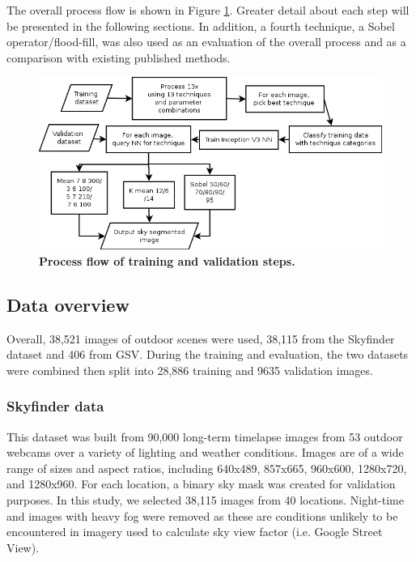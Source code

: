 \documentclass[final,3p,times,authoryear]{elsarticle}
\begin{document}
The overall process flow is shown in Figure \ref{fig:process}. Greater detail about each step will be presented in the following sections. In addition, a fourth technique, a Sobel operator/flood-fill, was also used as an evaluation of the overall process and as a comparison with existing published methods.

\begin{figure}
\centering    
\includegraphics[scale=0.60]{Images/TrainingProcessDiagram}
\caption{\bf Process flow of training and validation steps.}    
 \label{fig:process}  
\end{figure} 


\subsection{Data overview}\label{sec:data}
Overall, 38,521 images of outdoor scenes were used, 38,115 from the Skyfinder dataset and 406 from GSV. During the training and evaluation, the two datasets were combined then split into 28,886 training and 9635 validation images.


\subsubsection{Skyfinder data}\label{sec:finderdata}
This dataset was built from 90,000 long-term timelapse images from 53 outdoor webcams over a variety of lighting and weather conditions. Images are of a wide range of sizes and aspect ratios, including 640x489, 857x665, 960x600, 1280x720, and 1280x960. For each location, a binary sky mask was created for validation purposes. In this study, we selected 38,115 images from 40 locations. Night-time and images with heavy fog were removed as these are conditions unlikely to be encountered in imagery used to calculate sky view factor (i.e. Google Street View).
\end{document}
